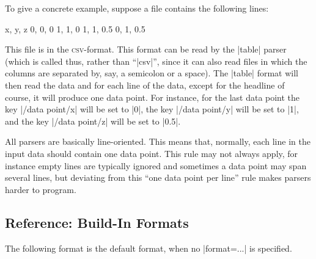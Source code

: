 To give a concrete example, suppose a file contains the following
lines:
%
\begin{codeexample}
x, y, z
0, 0, 0
1, 1, 0
1, 1, 0.5
0, 1, 0.5
\end{codeexample}
%
This file is in the \textsc{csv}-format. This format can be read by the |table|
parser (which is called thus, rather than ``|csv|'', since it can also read
files in which the columns are separated by, say, a semicolon or a space). The
|table| format will then read the data and for each line of the data, except
for the headline of course, it will produce one data point. For instance, for
the last data point the key |/data point/x| will be set to |0|, the key
|/data point/y| will be set to |1|, and the key |/data point/z| will be set to
|0.5|.

All parsers are basically line-oriented. This means that, normally, each line
in the input data should contain one data point. This rule may not always
apply, for instance empty lines are typically ignored and sometimes a data
point may span several lines, but deviating from this ``one data point per
line'' rule makes parsers harder to program.


\subsection{Reference: Build-In Formats}

The following format is the default format, when no |format=...| is specified.

